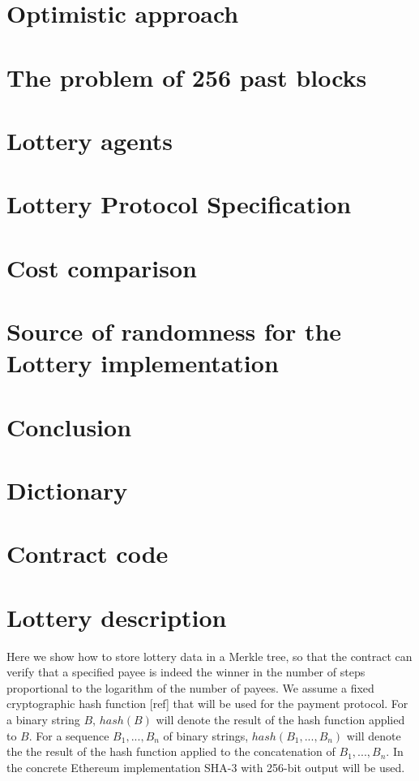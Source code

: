 \documentclass[a4paper]{article}
\begin{document}
\section{Optimistic approach}
\section{The problem of 256 past blocks}
\section{Lottery agents}
\section{Lottery Protocol Specification}
\section{Cost comparison}
\section{Source of randomness for the Lottery implementation}
\section{Conclusion}
\begin{thebibliography}{9}
\end{thebibliography}
\appendix
\section{Dictionary}
\section{Contract code}
\section{Lottery description}
Here we show how to store lottery data in a Merkle tree, so that the contract can verify that a specified payee
is indeed the winner in the number of steps proportional to the logarithm of the number of payees.
We assume a fixed cryptographic hash function [ref] that will be used for the payment protocol.
For a binary string $B$, $hash(B)$ will denote the result of the hash function applied to $B$.
For a sequence $B_1, ..., B_n$ of binary strings, $hash(B_1, ..., B_n)$ will denote the the result of the hash function
applied to the concatenation of $B_1, ..., B_n$. In the concrete Ethereum implementation SHA-3 with 256-bit output
will be used.
\end{document}
